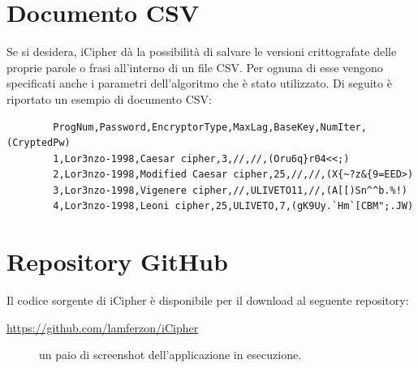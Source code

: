 \documentclass[a4paper, 12pt, one column, aas_macros]{article}
\begin{document}
	\section{Documento CSV}
	Se si desidera, iCipher dà la possibilità di salvare le versioni crittografate delle proprie parole o frasi all'interno di un file CSV. Per ognuna di esse vengono specificati anche i parametri dell'algoritmo che è stato utilizzato. Di seguito è riportato un esempio di documento CSV:
	\begin{verbatim}
		ProgNum,Password,EncryptorType,MaxLag,BaseKey,NumIter,(CryptedPw)
		1,Lor3nzo-1998,Caesar cipher,3,//,//,(Oru6q}r04<<;)
		2,Lor3nzo-1998,Modified Caesar cipher,25,//,//,(X{~?z&{9=EED>)
		3,Lor3nzo-1998,Vigenere cipher,//,ULIVETO11,//,(A[[)Sn^^b.%!)
		4,Lor3nzo-1998,Leoni cipher,25,ULIVETO,7,(gK9Uy.`Hm`[CBM";.JW)
	\end{verbatim}
	
	\section{Repository GitHub}
	Il codice sorgente di iCipher è disponibile per il download al seguente repository:
	\begin{center}
		\url{https://github.com/lamferzon/iCipher}
	\end{center}
	\begin{figure}[h!]
		\centering
		\caption[]{un paio di screenshot dell'applicazione in esecuzione.}
		\label{App_screens}
	\end{figure}
	
\end{document}
